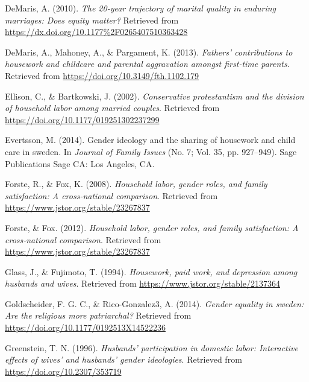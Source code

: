 \documentclass[
  man,floatsintext]{apa6}
\newlength{\cslhangindent}
\newlength{\cslentryspacingunit} %
\newenvironment{CSLReferences}[2] %
 {%
  \setlength{\parindent}{0pt}
  \ifodd #1
  \let\oldpar\par
  \def\par{\hangindent=\cslhangindent\oldpar}
  \fi
  \setlength{\parskip}{#2\cslentryspacingunit}
 }%
 {}
\begin{document}
\begin{CSLReferences}{1}{0}
\leavevmode{}%
DeMaris, A. (2010). \emph{The 20-year trajectory of marital quality in enduring marriages: Does equity matter?} Retrieved from \url{https://dx.doi.org/10.1177\%2F0265407510363428}

\leavevmode{}%
DeMaris, A., Mahoney, A., \& Pargament, K. (2013). \emph{Fathers' contributions to housework and childcare and parental aggravation amongst first-time parents}. Retrieved from \url{https://doi.org/10.3149/fth.1102.179}

\leavevmode{}%
Ellison, C., \& Bartkowski, J. (2002). \emph{Conservative protestantism and the division of household labor among married couples}. Retrieved from \url{https://doi.org/10.1177/019251302237299}

\leavevmode{}%
Evertsson, M. (2014). Gender ideology and the sharing of housework and child care in sweden. In \emph{Journal of Family Issues} (No. 7; Vol. 35, pp. 927--949). Sage Publications Sage CA: Los Angeles, CA.

\leavevmode{}%
Forste, R., \& Fox, K. (2008). \emph{Household labor, gender roles, and family satisfaction: A cross-national comparison}. Retrieved from \url{https://www.jstor.org/stable/23267837}

\leavevmode{}%
Forste, \& Fox. (2012). \emph{Household labor, gender roles, and family satisfaction: A cross-national comparison}. Retrieved from \url{https://www.jstor.org/stable/23267837}

\leavevmode{}%
Glass, J., \& Fujimoto, T. (1994). \emph{Housework, paid work, and depression among husbands and wives}. Retrieved from \url{https://www.jstor.org/stable/2137364}

\leavevmode{}%
Goldscheider, F. G. C., \& Rico-Gonzalez3, A. (2014). \emph{Gender equality in sweden: Are the religious more patriarchal?} Retrieved from \url{https://doi.org/10.1177/0192513X14522236}

\leavevmode{}%
Greenstein, T. N. (1996). \emph{Husbands' participation in domestic labor: Interactive effects of wives' and husbands' gender ideologies}. Retrieved from \url{https://doi.org/10.2307/353719}


\end{CSLReferences}
\end{document}
